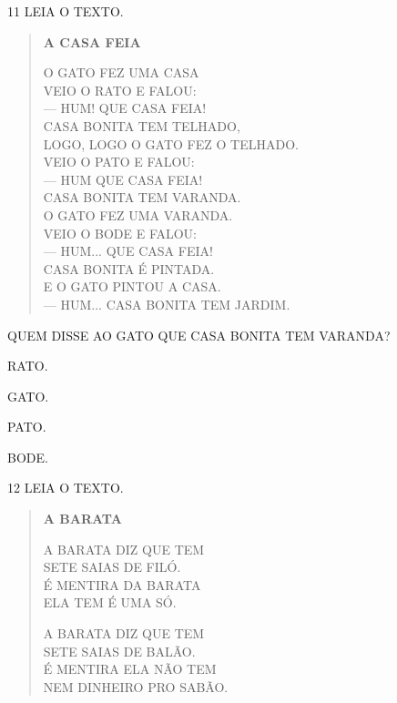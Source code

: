 \num{11} LEIA O TEXTO.

\begin{myquote}
\begin{verse}
\textbf{A CASA FEIA}

O GATO FEZ UMA CASA\\
VEIO O RATO E FALOU:\\
--- HUM! QUE CASA FEIA!\\
CASA BONITA TEM TELHADO,\\
LOGO, LOGO O GATO FEZ O TELHADO.\\
VEIO O PATO E FALOU:\\
--- HUM QUE CASA FEIA!\\
CASA BONITA TEM VARANDA.\\
O GATO FEZ UMA VARANDA.\\
VEIO O BODE E FALOU:\\
--- HUM... QUE CASA FEIA!\\
CASA BONITA É PINTADA.\\
E O GATO PINTOU A CASA.\\
--- HUM... CASA BONITA TEM JARDIM.\\
\end{verse}

\end{myquote}	

QUEM DISSE AO GATO QUE CASA BONITA TEM VARANDA? 

\begin{multicols}{2}
\begin{escolha}
\item RATO.

\item GATO.

\item PATO.

\item BODE.
\end{escolha}
\end{multicols}

\num{12} LEIA O TEXTO.

\begin{myquote}
\begin{verse}
\textbf{A BARATA}

A BARATA DIZ QUE TEM\\
SETE SAIAS DE FILÓ.\\
É MENTIRA DA BARATA\\
ELA TEM É UMA SÓ.


A BARATA DIZ QUE TEM\\
SETE SAIAS DE BALÃO.\\
É MENTIRA ELA NÃO TEM\\
NEM DINHEIRO PRO SABÃO.
\end{verse}

\end{myquote}

